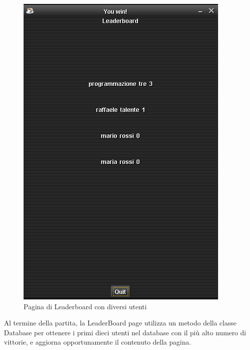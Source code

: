 \begin{figure}
    \centering
    \includegraphics[scale=0.5]{img/leaderboard-page2}
    \caption{Pagina di Leaderboard con diversi utenti}
    \label{fig:leaderboard-page2}
\end{figure}

Al termine della partita, la LeaderBoard page utilizza un metodo della classe Database per ottenere i primi dieci
utenti nel database con il più alto numero di vittorie, e aggiorna opportunamente il contenuto della pagina.